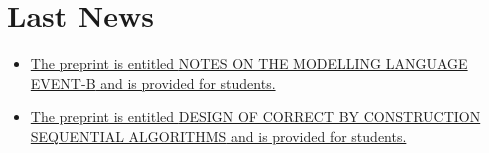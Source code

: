 \documentclass[ 12pt]{article}
\begin{document}

\section{Last News}
\label{sec:last-news}



\begin{itemize}


  
\item[]
  \href{https://mery54.github.io/mery/publications/preprint-chaptereventb.pdf}{The
    preprint is  entitled \textsf{NOTES ON THE MODELLING LANGUAGE EVENT-B}  and is provided for students.}


  
\item[]
  \href{https://mery54.github.io/mery/publications/preprint-chapterseqalgo.pdf}{The
    preprint is  entitled \textsf{DESIGN OF CORRECT BY CONSTRUCTION
      SEQUENTIAL ALGORITHMS}  and is provided for students.}
    
\end{itemize}
\end{document}
